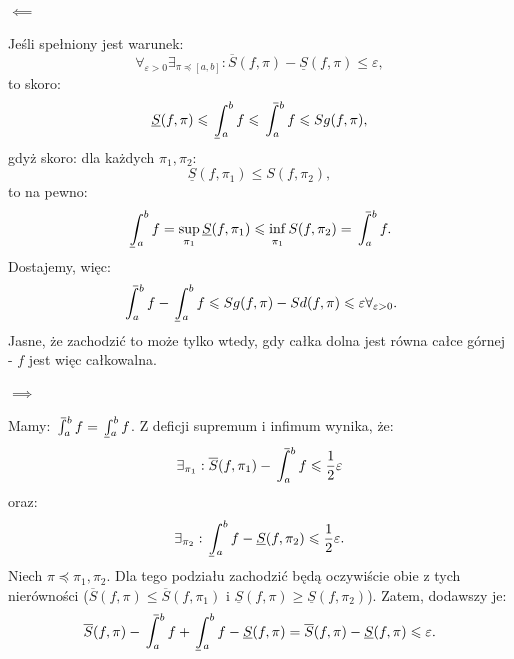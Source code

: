 \documentclass{article}
\newcounter{defi}
\numberwithin{defi}{section}
\numberwithin{defi}{section}
\renewcommand{\inf}{\mathop{\mathrm{inf}\vphantom{\mathrm{sup}}}}
\newcommand{\Sd}{\underline{S}}
\newcommand{\Sg}{\overline{S}}
\newcommand{\Cd}{\mkern3mu\underline{\vphantom{\intop}\mkern7mu}\mkern-10mu\int}
\def\Cg{\mathchoice%
{\mkern13mu\overline{\vphantom{\intop}\mkern7mu}\mkern-20mu}%
{\mkern7mu\overline{\vphantom{\intop}\mkern7mu}\mkern-14mu}%
{\mkern7mu\overline{\vphantom{\intop}\mkern7mu}\mkern-14mu}%
{\mkern7mu\overline{\vphantom{\intop}\mkern7mu}\mkern-14mu}%
\int}
\providecommand{\eps}{\varepsilon}
\providecommand{\half}{\frac{1}{2}}
\renewcommand{\geq}{\geqslant}
\renewcommand{\leq}{\leqslant}
\begin{document}
\begin{dow}
    \paragraph{$\impliedby$} Jeśli spełniony jest warunek: \begin{equation*}
        \forall_{\eps > 0} \exists_{\pi \preceq [a, b]}: \Sg(f, \pi) - \Sd(f, \pi) \leq \eps,
    \end{equation*} to skoro: \begin{equation*}
        \Sd(f, \pi) \leq \Cd_{a}^{b} f \leq \Cg_{a}^{b} f \leq Sg(f, \pi),
    \end{equation*} gdyż skoro: dla każdych $\pi_1, \pi_2$: \begin{equation*}
        \Sd(f, \pi_1) \leq S(f, \pi_2), 
    \end{equation*} to na pewno: \begin{equation}
        \Cd_{a}^{b} f = \sup_{\pi_1}  \Sd(f, \pi_1) \leq \inf_{\pi_1}  S(f, \pi_2) = \Cg_{a}^{b}f.
    \end{equation} Dostajemy, więc: \begin{equation*}
        \Cg_{a}^{b} f - \Cd_{a}^{b} f \leq Sg(f, \pi) - Sd(f, \pi) \leq \eps \forall_{\eps > 0}.
    \end{equation*} Jasne, że zachodzić to może tylko wtedy, gdy całka dolna jest równa całce górnej - $f$ jest więc całkowalna.

    \paragraph{$\implies$} Mamy:  $\Cg_{a}^{b} f = \Cd_{a}^{b} f$. Z deficji supremum i infimum wynika, że: \begin{equation*}
        \exists_{\pi_1}: \Sg(f, \pi_1) - \Cg_{a}^{b} f \leq \half \eps
    \end{equation*} oraz: \begin{equation*}
        \exists_{\pi_2}:  \Cd_{a}^{b} f - \Sd(f, \pi_2)\leq \half \eps.
    \end{equation*} Niech $\pi \preceq \pi_1, \pi_2$. Dla tego podziału zachodzić będą oczywiście obie z tych nierówności ($\Sg (f, \pi) \leq \Sg(f, \pi_1)$ i $\Sd (f, \pi) \geq \Sd(f, \pi_2)$). Zatem, dodawszy je: \begin{equation*}
        \Sg(f, \pi) - \Cg_{a}^{b} f + \Cd_{a}^{b} f - \Sd(f, \pi) = \Sg(f, \pi)  - \Sd(f, \pi) \leq \eps.
    \end{equation*}
\end{dow}
\end{document}
